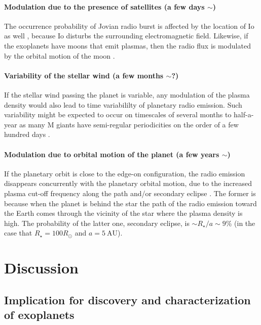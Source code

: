 \documentclass[iop,numberedappendix,apj]{emulateapj}
\begin{document}
\paragraph{Modulation due to the presence of satellites (a few days $\sim $)}
The occurrence probability of Jovian radio burst is affected by the location of Io as well \citep{dessler1983}, because Io disturbs the surrounding electromagnetic field. 
Likewise, if the exoplanets have moons that emit plasmas, then the radio flux is  modulated by the orbital motion of the moon \citep[see e.g.,][]{noyola2014}. 

\paragraph{Variability of the stellar wind (a few months $\sim $?)}
If the stellar wind passing the planet is variable, any modulation of the plasma density would also lead to time variabililty of planetary radio emission.  Such variability might be expected to occur on timescales of several months to half-a-year as many M giants have semi-regular periodicities on the order of a few hundred days \citep{Kiss:1999aa}.

%
\paragraph{Modulation due to orbital motion of the planet (a few years $\sim $)}
If the planetary orbit is close to the edge-on configuration, the radio emission disappears concurrently with the planetary orbital motion, due to the increased plasma cut-off frequency along the path and/or secondary eclipse \citep{lecavelier_et_al2013}. 
The former is because when the planet is behind the star the path of the radio emission toward the Earth comes through the vicinity of the star where the plasma density is high.
The probability of the latter one, secondary eclipse, is $\sim R_\star/a \sim 9$\% (in the case that $R_{\star}=100R_{\odot }$ and $a=5~\mathrm{AU}$). 
%



\section{Discussion}
\label{s:discussion}


\subsection{Implication for discovery and characterization of exoplanets}
\label{ss:implication}
\end{document}
